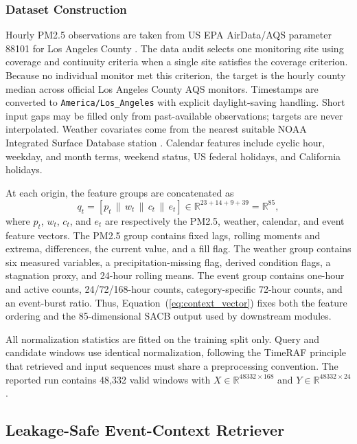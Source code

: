 \subsubsection{Dataset Construction}
Hourly PM2.5 observations are taken from US EPA AirData/AQS parameter 88101 for
Los Angeles County \cite{epaairdata2026}. The data audit selects one monitoring
site using coverage and continuity criteria when a single site satisfies the
coverage criterion. Because no individual monitor met this criterion, the
target is the hourly county median across official Los Angeles County AQS
monitors. Timestamps are converted to \texttt{America/Los\_Angeles} with
explicit daylight-saving handling. Short input gaps may be filled only from
past-available observations; targets are never interpolated. Weather covariates
come from the nearest suitable NOAA Integrated Surface Database station
\cite{noaaisd2026}. Calendar features include cyclic hour, weekday, and month
terms, weekend status, US federal holidays, and California holidays.

At each origin, the feature groups are concatenated as
\begin{equation}
q_t=[p_t\,\|\,w_t\,\|\,c_t\,\|\,e_t]
\in\mathbb{R}^{23+14+9+39}=\mathbb{R}^{85},
\label{eq:context_vector}
\end{equation}
where $p_t$, $w_t$, $c_t$, and $e_t$ are respectively the PM2.5, weather,
calendar, and event feature vectors. The PM2.5 group contains fixed lags,
rolling moments and extrema, differences, the current value, and a fill flag.
The weather group contains six measured variables, a precipitation-missing
flag, derived condition flags, a stagnation proxy, and 24-hour rolling means.
The event group contains one-hour and active counts, 24/72/168-hour counts,
category-specific 72-hour counts, and an event-burst ratio.
Thus, Equation~(\ref{eq:context_vector}) fixes both the feature ordering and
the 85-dimensional SACB output used by downstream modules.

All normalization statistics are fitted on the training split only. Query and
candidate windows use identical normalization, following the TimeRAF principle
that retrieved and input sequences must share a preprocessing convention. The
reported run contains 48,332 valid windows with
$X\in\mathbb{R}^{48332\times168}$ and
$Y\in\mathbb{R}^{48332\times24}$.

\subsection{Leakage-Safe Event-Context Retriever}

